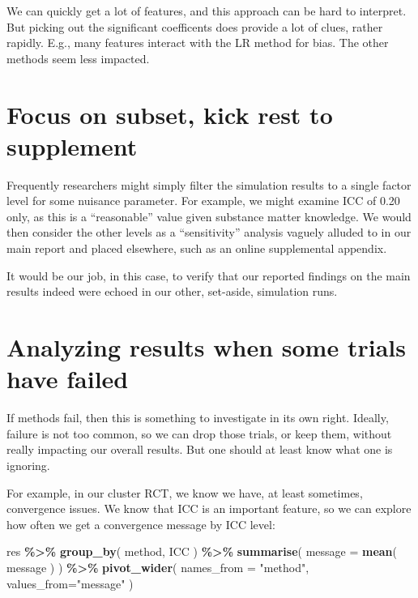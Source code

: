 \documentclass[
]{book}
\newenvironment{Shaded}{\begin{snugshade}}{\end{snugshade}}
\newcommand{\AttributeTok}[1]{\textcolor[rgb]{0.13,0.29,0.53}{#1}}
\newcommand{\FunctionTok}[1]{\textcolor[rgb]{0.13,0.29,0.53}{\textbf{#1}}}
\newcommand{\NormalTok}[1]{#1}
\newcommand{\SpecialCharTok}[1]{\textcolor[rgb]{0.81,0.36,0.00}{\textbf{#1}}}
\newcommand{\StringTok}[1]{\textcolor[rgb]{0.31,0.60,0.02}{#1}}
\begin{document}
We can quickly get a lot of features, and this approach can be hard to interpret. But picking out the significant coefficents does provide a lot of clues, rather rapidly.
E.g., many features interact with the LR method for bias. The other methods seem less impacted.

\section{Focus on subset, kick rest to supplement}\label{focus-on-subset-kick-rest-to-supplement}

Frequently researchers might simply filter the simulation results to a single factor level for some nuisance parameter.
For example, we might examine ICC of 0.20 only, as this is a ``reasonable'' value given substance matter knowledge.
We would then consider the other levels as a ``sensitivity'' analysis vaguely alluded to in our main report and placed elsewhere, such as an online supplemental appendix.

It would be our job, in this case, to verify that our reported findings on the main results indeed were echoed in our other, set-aside, simulation runs.

\section{Analyzing results when some trials have failed}\label{analyzing-results-when-some-trials-have-failed}

If methods fail, then this is something to investigate in its own right.
Ideally, failure is not too common, so we can drop those trials, or keep them, without really impacting our overall results.
But one should at least know what one is ignoring.

For example, in our cluster RCT, we know we have, at least sometimes, convergence issues.
We know that ICC is an important feature, so we can explore how often we get a convergence message by ICC level:

\begin{Shaded}
\begin{Highlighting}[]
\NormalTok{res }\SpecialCharTok{\%\textgreater{}\%} 
  \FunctionTok{group\_by}\NormalTok{( method, ICC ) }\SpecialCharTok{\%\textgreater{}\%}
  \FunctionTok{summarise}\NormalTok{( }\AttributeTok{message =} \FunctionTok{mean}\NormalTok{( message ) ) }\SpecialCharTok{\%\textgreater{}\%}
  \FunctionTok{pivot\_wider}\NormalTok{( }\AttributeTok{names\_from =} \StringTok{"method"}\NormalTok{, }\AttributeTok{values\_from=}\StringTok{"message"}\NormalTok{ )}
\end{Highlighting}
\end{Shaded}
\end{document}
